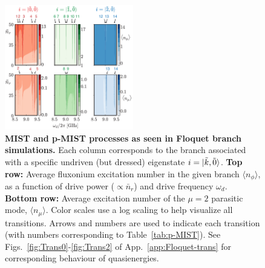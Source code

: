 \documentclass[%
reprint,
superscriptaddress,
 amsmath,amssymb,
 aps,
 prx,
longbibliography,
floatfix,
]{revtex4-2}
\begin{document}
\begin{figure}[!htb]
    \centering
    \includegraphics[width=0.5\textwidth]{Figures/Floquet_min.pdf}
    \caption{{\bf MIST and p-MIST processes as seen in Floquet branch simulations.}  
    Each column corresponds to the branch associated with a specific undriven (but dressed) eigenstate $i=\ket{\tilde{k},\tilde{0}}$.  
    \textbf{Top row:} Average fluxonium excitation number in the given branch $\langle n_\phi\rangle $, as a function of drive power ($\propto\bar{n}_r$) and drive frequency $\omega_d$. \textbf{Bottom row:} Average excitation number of the $\mu=2$ parasitic mode, $\langle n_\mu\rangle$. Color scales use a log scaling to help visualize all transitions.  Arrows and numbers are used to indicate each transition (with numbers corresponding to Table~\ref{tab:p-MIST}). See Figs.~\ref{fig:Trans0}-\ref{fig:Trans2} of App.~\ref{app:Floquet-trans} for corresponding behaviour of  quasienergies.}
    \label{fig:Floquet}
\end{figure}
\end{document}
